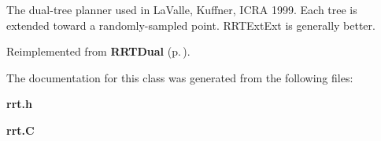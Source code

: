 The dual-tree planner used in La\-Valle, Kuffner, ICRA 1999. Each tree is extended toward a randomly-sampled point. RRTExt\-Ext is generally better.



Reimplemented from {\bf RRTDual} {\rm (p.\,\pageref{classRRTDual_a2})}.

The documentation for this class was generated from the following files:\begin{CompactItemize}
\item 
{\bf rrt.h}\item 
{\bf rrt.C}\end{CompactItemize}
